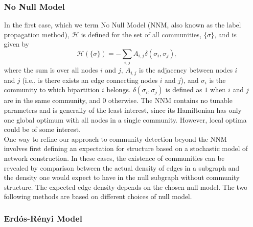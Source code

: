 \documentclass[11pt]{article}
\begin{document}
\subsubsection{No Null Model}\label{appendix:NoNullModel}
In the first case, which we term No Null Model (NNM, also known as the label propagation
method), $\mathcal{H}$ is defined for the set of all communities, $\{\sigma\}$, and is given by
\begin{equation}\label{eq:NoNullModel}
\mathcal{H}(\{\sigma\}) = - \displaystyle\sum_{i,j} A_{i,j} \delta(\sigma_{i}, \sigma_{j}),
\end{equation}
where the sum is over all nodes $i$ and $j$, $A_{i,j}$ is the adjacency between nodes $i$ and $j$ (i.e., is there exists an edge connecting nodes $i$ and $j$), and $\sigma_{i}$ is the community to which bipartition $i$ belongs. $\delta(\sigma_{i}, \sigma_{j})$ is defined as $1$ when $i$ and $j$ are in the same community, and $0$ otherwise. The NNM contains no tunable parameters and is generally of the least interest, since its Hamiltonian has only one global optimum with all nodes in a single community. However, local optima could be of some interest. \\


One way to refine our approach to community detection beyond the NNM involves first
defining an expectation for structure based on a stochastic model of network construction. In
these cases, the existence of communities can be revealed by comparison between the actual
density of edges in a subgraph and the density one would expect to have in the null subgraph
without community structure. The expected edge density depends on the chosen null model.
The two following methods are based on different choices of null model. \\


\subsubsection{Erd\'{o}s-R\'{e}nyi Model}\label{appendix:ERModel}
\end{document}

